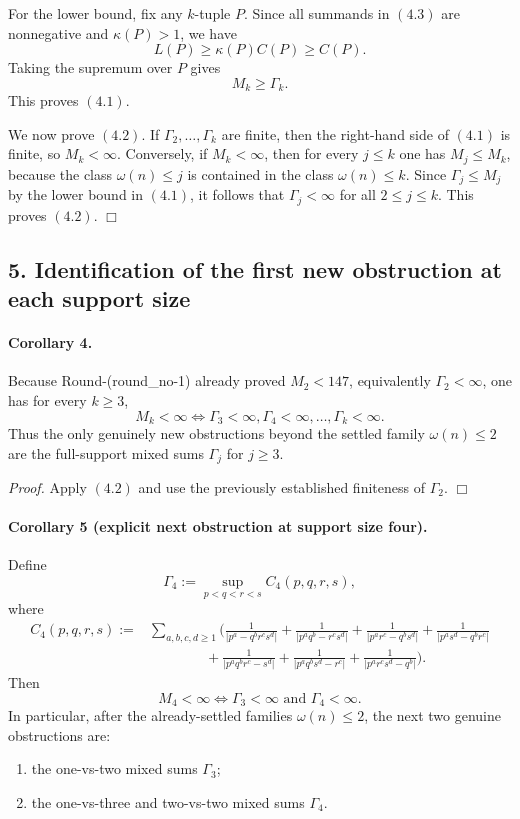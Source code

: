 For the lower bound, fix any \(k\)-tuple \(P\). Since all summands in \((4.3)\) are nonnegative and \(\kappa(P)>1\), we have
\[
L(P)\ge \kappa(P)C(P)\ge C(P).
\]
Taking the supremum over \(P\) gives
\[
M_k\ge \Gamma_k.
\]
This proves \((4.1)\).

We now prove \((4.2)\).
If \(\Gamma_2,\dots,\Gamma_k\) are finite, then the right-hand side of \((4.1)\) is finite, so \(M_k<\infty\).
Conversely, if \(M_k<\infty\), then for every \(j\le k\) one has \(M_j\le M_k\), because the class \(\omega(n)\le j\) is contained in the class \(\omega(n)\le k\). Since \(\Gamma_j\le M_j\) by the lower bound in \((4.1)\), it follows that \(\Gamma_j<\infty\) for all \(2\le j\le k\).
This proves \((4.2)\).
\hfill\(\Box\)

\subsection*{5. Identification of the first new obstruction at each support size}

\paragraph{Corollary 4.}
Because Round-(round\_no-1) already proved \(M_2<147\), equivalently \(\Gamma_2<\infty\), one has for every \(k\ge 3\),
\[
M_k<\infty
\iff
\Gamma_3<\infty,\Gamma_4<\infty,\dots,\Gamma_k<\infty.
\tag{5.1}
\]
Thus the only genuinely new obstructions beyond the settled family \(\omega(n)\le 2\) are the full-support mixed sums \(\Gamma_j\) for \(j\ge 3\).

\emph{Proof.}
Apply \((4.2)\) and use the previously established finiteness of \(\Gamma_2\).
\hfill\(\Box\)

\paragraph{Corollary 5 (explicit next obstruction at support size four).}
Define
\[
\Gamma_4:=\sup_{p<q<r<s} C_4(p,q,r,s),
\]
where
\[
\begin{aligned}
C_4(p,q,r,s):={}&
\sum_{a,b,c,d\ge 1}
\Biggl(
\frac{1}{|p^a-q^b r^c s^d|}
+\frac{1}{|p^a q^b-r^c s^d|}
+\frac{1}{|p^a r^c-q^b s^d|}
+\frac{1}{|p^a s^d-q^b r^c|}
\\
&\hspace{4em}
+\frac{1}{|p^a q^b r^c-s^d|}
+\frac{1}{|p^a q^b s^d-r^c|}
+\frac{1}{|p^a r^c s^d-q^b|}
\Biggr).
\end{aligned}
\]
Then
\[
M_4<\infty
\iff
\Gamma_3<\infty\text{ and }\Gamma_4<\infty.
\]
In particular, after the already-settled families \(\omega(n)\le 2\), the next two genuine obstructions are:
\begin{enumerate}
\item the one-vs-two mixed sums \(\Gamma_3\);
\item the one-vs-three and two-vs-two mixed sums \(\Gamma_4\).
\end{enumerate}

